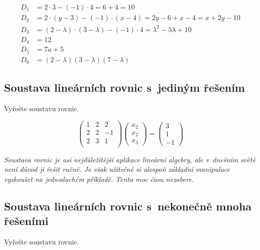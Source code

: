 \reseni

\begin{equation*}
  \begin{aligned}
    D_1&=2\cdot 3 - (-1)\cdot 4=6+4=10\\
    D_2&=2\cdot(y-3)-(-1)\cdot (x-4)=2y-6+x-4=x+2y-10\\
    D_3&=(2-\lambda)\cdot(3-\lambda)-(-1)\cdot 4 = \lambda^2-5\lambda+10\\
    D_4&=12\\
    D_5&=7a+5\\
    D_6&=(2-\lambda)(3-\lambda)(7-\lambda)
\end{aligned}
\end{equation*}

\konec



\stranka


\subsection{Soustava lineárních rovnic s jediným řešením} Vyřešte soustavu rovnic.

\shorthandoff{-}
\begin{equation*}
  \begin{pmatrix}
1 &2 &2 \\
2 &2 &-1\\
2 &3 &1 \\
\end{pmatrix}
\begin{pmatrix}
  x_2\\x_2\\x_3
\end{pmatrix}
=
\begin{pmatrix}
  3\\1\\-1
\end{pmatrix}
\end{equation*}


\textit{Soustava rovnic je asi nejdůležitější aplikace lineární algebry, ale v dnešním světě není důvod ji řešit ručně. Je však užitečné si alespoň základní manipulace vyzkoušet na jednoduchém příkladě. Tento moc času nezabere.}



\stranka
\subsection{Soustava lineárních rovnic s nekonečně mnoha řešeními} Vyřešte soustavu rovnic.


